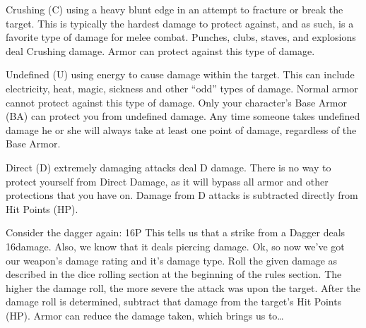 \documentclass[twoside]{book}
\begin{document}
                
                 Crushing (C)   
                    using a heavy blunt edge in an attempt to
                   fracture or break the target. This is typically the
                   hardest damage to protect against, and as such, is a
                   favorite type of damage for melee combat. Punches,
                   clubs, staves, and explosions deal Crushing damage.
                   Armor can protect against this type of damage. 
                
                
                 Undefined (U)   
                    using energy to cause damage within the target.
                   This can include electricity, heat, magic, sickness
                   and other “odd” types of damage. Normal
                   armor cannot protect against this type of damage. Only
                   your character’s Base Armor (BA) can protect you
                   from undefined damage. Any time someone takes
                   undefined damage he or she will always take at least
                   one point of damage, regardless of the Base Armor.
                   
                
                
                 Direct (D)   
                    extremely damaging attacks deal D damage. There
                   is no way to protect yourself from Direct Damage, as
                   it will bypass all armor and other protections that
                   you have on. Damage from D attacks is subtracted
                   directly from Hit Points (HP). 
                
             Consider the dagger again: 16P  This tells us that a strike from a Dagger deals 16damage. Also, we know that it deals piercing damage.
                Ok, so now we’ve got our weapon’s damage
               rating and it’s damage type. Roll the given damage
               as described in the dice rolling section at the beginning
               of the rules section. The higher the damage roll, the more
               severe the attack was upon the target.  After the damage roll is determined, subtract that
               damage from the target’s Hit Points (HP). Armor can
               reduce the damage taken, which brings us to…
               
\end{document}
